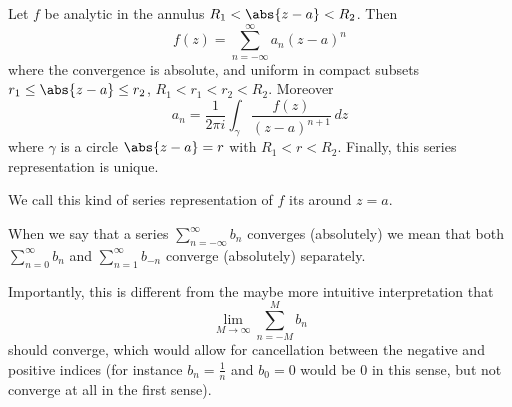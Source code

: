 


\begin{theorem}\label{thm5.3}
	Let $f$ be analytic in the annulus $R_1 < \abs{z - a} < R_2$.
	Then
	\[
		f(z) = \sum_{n = -\infty}^\infty a_n (z - a)^n
	\]
	where the convergence is absolute, and uniform in compact subsets $r_1 \leq \abs{z - a} \leq r_2$, $R_1 < r_1 < r_2 < R_2$.
	Moreover
	\[
		a_n = \frac{1}{2 \pi i} \int_\gamma \frac{f(z)}{(z - a)^{n + 1}} \, d z
	\]
	where $\gamma$ is a circle $\abs{z - a} = r$ with $R_1 < r < R_2$.
	Finally, this series representation is unique.
\end{theorem}

We call this kind of series representation of $f$ its  around $z = a$.

\begin{remark}
	When we say that a series $\sum\limits_{n = -\infty}^\infty b_n$ converges (absolutely) we mean that both $\sum\limits_{n = 0}^\infty b_n$ and $\sum\limits_{n = 1}^\infty b_{- n}$ converge (absolutely) separately.

	Importantly, this is different from the maybe more intuitive interpretation that
	\[
		\lim_{M \to \infty} \sum_{n = -M}^M b_n
	\]
	should converge, which would allow for cancellation between the negative and positive indices (for instance $b_n = \frac{1}{n}$ and $b_0 = 0$ would be $0$ in this sense, but not converge at all in the first sense).
\end{remark}

